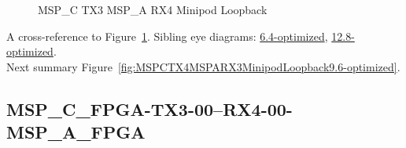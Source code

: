 \begin{figure}[h]
\begin{subfigure}{0.33\textwidth}
\hyperref[sec:MSPCFPGATX306RX406MSPAFPGA9.6-optimized]{}
\end{subfigure}\hspace*{\fill}
\begin{subfigure}{0.33\textwidth}
\hyperref[sec:MSPCFPGATX307RX407MSPAFPGA9.6-optimized]{}
\end{subfigure}\hspace*{\fill}
\begin{subfigure}{0.33\textwidth}
\hyperref[sec:MSPCFPGATX308RX408MSPAFPGA9.6-optimized]{}
\end{subfigure}

\begin{subfigure}{0.33\textwidth}
\hyperref[sec:MSPCFPGATX309RX409MSPAFPGA9.6-optimized]{}
\end{subfigure}\hspace*{\fill}
\begin{subfigure}{0.33\textwidth}
\hyperref[sec:MSPCFPGATX310RX410MSPAFPGA9.6-optimized]{}
\end{subfigure}\hspace*{\fill}
\begin{subfigure}{0.33\textwidth}
\hyperref[sec:MSPCFPGATX311RX411MSPAFPGA9.6-optimized]{}
\end{subfigure}

\caption{MSP\_C TX3 MSP\_A RX4 Minipod Loopback} \label{fig:MSPCTX3MSPARX4MinipodLoopback9.6-optimized}
\end{figure}

A cross-reference to Figure~\ref{fig:MSPCTX3MSPARX4MinipodLoopback9.6-optimized}.
Sibling eye diagrams: \hyperref[sec:MSPCTX3MSPARX4MinipodLoopback6.4-optimized]{6.4-optimized}, \hyperref[sec:MSPCTX3MSPARX4MinipodLoopback12.8-optimized]{12.8-optimized}. \\
Next summary Figure~\ref{fig:MSPCTX4MSPARX3MinipodLoopback9.6-optimized}.
\clearpage
% 
\subsection{MSP\_C\_FPGA-TX3-00--RX4-00-MSP\_A\_FPGA}\label{sec:MSPCFPGATX300RX400MSPAFPGA9.6-optimized}

